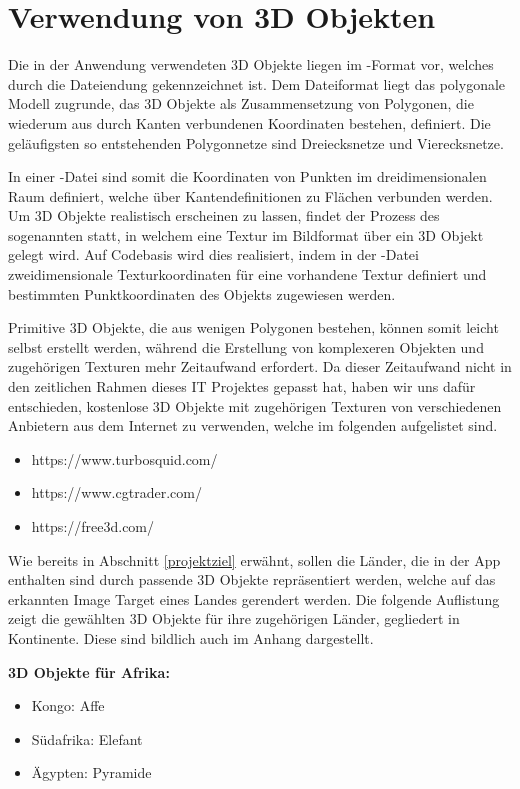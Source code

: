 \section{Verwendung von 3D Objekten}\label{verwendung_3d_objekte}
Die in der Anwendung verwendeten 3D Objekte liegen im -Format vor, welches durch die Dateiendung  gekennzeichnet ist. 
Dem Dateiformat liegt das polygonale Modell zugrunde, das 3D Objekte als Zusammensetzung von Polygonen, die wiederum aus durch Kanten verbundenen Koordinaten bestehen, definiert. 
Die geläufigsten so entstehenden Polygonnetze sind Dreiecksnetze und Vierecksnetze.

In einer  -Datei sind somit die Koordinaten von Punkten im dreidimensionalen Raum definiert, welche über Kantendefinitionen zu Flächen verbunden werden. 
Um 3D Objekte realistisch erscheinen zu lassen, findet der Prozess des sogenannten  statt, in welchem eine Textur im Bildformat über ein 3D Objekt gelegt wird. 
Auf Codebasis wird dies realisiert, indem in der -Datei zweidimensionale Texturkoordinaten für eine vorhandene Textur definiert und bestimmten Punktkoordinaten des Objekts zugewiesen werden.

Primitive 3D Objekte, die aus wenigen Polygonen bestehen, können somit leicht selbst erstellt werden, während die Erstellung von komplexeren Objekten und zugehörigen Texturen mehr Zeitaufwand erfordert. 
Da dieser Zeitaufwand nicht in den zeitlichen Rahmen dieses IT Projektes gepasst hat, haben wir uns dafür entschieden, kostenlose 3D Objekte mit zugehörigen Texturen von verschiedenen Anbietern aus dem Internet zu verwenden, welche im folgenden aufgelistet sind.

\begin{itemize}
\item https://www.turbosquid.com/
\item https://www.cgtrader.com/
\item https://free3d.com/
\end{itemize}

Wie bereits in Abschnitt \ref{projektziel} erwähnt, sollen die Länder, die in der App enthalten sind durch passende 3D Objekte repräsentiert werden, welche auf das erkannten Image Target eines Landes gerendert werden. 
Die folgende Auflistung zeigt die gewählten 3D Objekte für ihre zugehörigen Länder, gegliedert in Kontinente. Diese sind bildlich auch im Anhang dargestellt.

\textbf{3D Objekte für Afrika:}
\begin{itemize}
\item Kongo: Affe
\item Südafrika: Elefant
\item Ägypten: Pyramide
\end{itemize}

